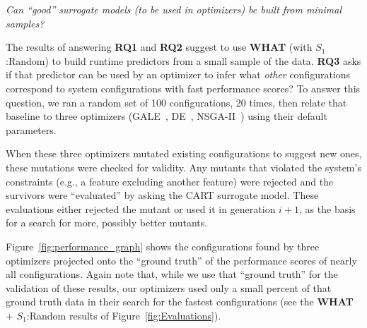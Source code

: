 \documentclass{sig-alternative}
\newcommand{\fig}[1]{Figure~\ref{fig:#1}}
\newcommand{\what}{{\bf WHAT }}
\begin{document}
\begin{center}
{\em
Can ``good'' surrogate models (to be used in optimizers)
be built from minimal samples?}
\end{center}

The results of answering {\bf RQ1} and {\bf RQ2} suggest to use \what (with $S_1$:Random) to build runtime predictors from a small sample of the data. {\bf RQ3}
asks if that predictor can be used by an optimizer to infer what {\em other} configurations correspond to system configurations with fast performance scores?
To answer this question,  we ran  a random set of 100 
configurations, 20 times, then relate that baseline to three optimizers (GALE~\cite{krall2014gale}, DE~\cite{storn1997differential}, NSGA-II~\cite{deb00afast}) using their
default parameters.
 
When these three optimizers mutated existing configurations to suggest new ones,
these mutations were checked for validity. Any mutants that violated the system's constraints (e.g., a feature excluding another feature) were rejected
and the survivors were ``evaluated'' by asking the CART surrogate model.
These evaluations either rejected the mutant or used it in generation $i+1$, as the basis for a search for more, possibly
better  mutants.




\fig{performance_graph} shows the configurations found by three optimizers projected onto the ``ground truth'' of the performance scores of nearly
all configurations. Again note that, while we use that ``ground truth'' for the validation of these results, our optimizers 
used only a small percent of that ground truth data in their search for the fastest configurations (see the \what + $S_1$:Random
results of \fig{Evaluations}).
\end{document}
